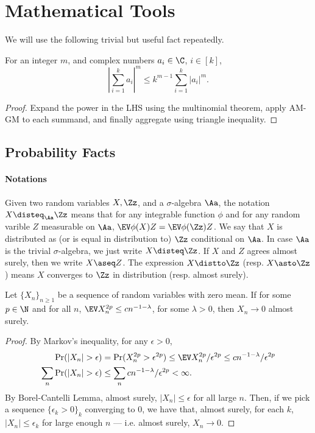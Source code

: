 \documentclass[main.tex]{subfiles}
\begin{document}
\section{Mathematical Tools}

\label{sec:proofs}

We will use the following trivial but useful fact repeatedly.

\begin{lemma}\label{lem:powerbound}
For an integer $m$, and complex numbers $a_i \in \C$, $i \in [k]$,
\[
\left| \sum_{i=1}^k a_i \right|^m
\le 
k^{m-1} \sum_{i=1}^k \left|a_i\right|^m
.
\]
\end{lemma}
\begin{proof}
Expand the power in the LHS using the multinomial theorem, apply AM-GM to each summand, and finally aggregate using triangle inequality.
\end{proof}

\subsection{Probability Facts}
\label{sec:probfacts}

\paragraph{Notations}
Given two random variables $X, \Zz$, and a $\sigma$-algebra $\Aa$, the notation $X \disteq_\Aa \Zz$ means that for any integrable function $\phi$ and for any random varible $Z$ measurable on $\Aa$, $\EV \phi(X) Z = \EV \phi(\Zz)Z$.
We say that $X$ is distributed as (or is equal in distribution to) $\Zz$ conditional on $\Aa$.
In case $\Aa$ is the trivial $\sigma$-algebra, we just write $X \disteq \Zz$.
If $X$ and $Z$ agrees almost surely, then we write $X \aseq Z$.
The expression $X \distto \Zz$ (resp. $X \asto \Zz$) means $X$ converges to $\Zz$ in distribution (resp. almost surely).

\begin{lemma}\label{lemma:momentBoundASConvergence}
Let $\{X_n\}_{n \ge 1}$ be a sequence of random variables with zero mean.
If for some $p \in \N$ and for all $n$, $\EV X_n^{2p} \le c n^{-1-\lambda}$, for some $\lambda > 0$, then $X_n \to 0$ almost surely.
\end{lemma}
\begin{proof}
By Markov's inequality, for any $\epsilon > 0$,
\begin{align*}
    \Pr(|X_n| > \epsilon)
        &=
            \Pr(X_n^{2p} > \epsilon^{2p})
        \le
            \EV X_n^{2p}/\epsilon^{2p}
        \le c n^{-1-\lambda}/\epsilon^{2p}
        \\
    \sum_n \Pr(|X_n| > \epsilon)
        &\le
            \sum_n c n^{-1-\lambda}/\epsilon^{2p}
        <    
            \infty.
\end{align*}
By Borel-Cantelli Lemma, almost surely, $|X_n| \le \epsilon$ for all large $n$.
Then, if we pick a sequence $\{\epsilon_k > 0\}_k$ converging to 0, we have that, almost surely, for each $k$, $|X_n| \le \epsilon_k$ for large enough $n$ --- i.e. almost surely, $X_n \to 0$.
\end{proof}
\end{document}
